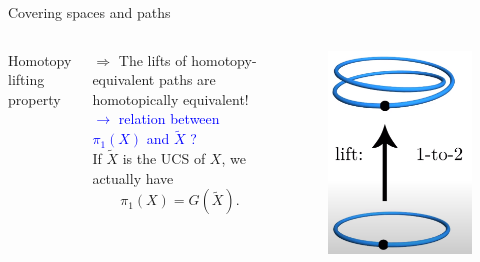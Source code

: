 \documentclass[9pt]{beamer}
\begin{document}
\begin{frame}{Covering spaces and paths}
\begin{columns}[T,onlytextwidth]
\begin{block}{Homotopy lifting property}
            \end{block}
            $\Rightarrow$ The lifts of homotopy-equivalent paths are homotopically equivalent! \textcolor{blue}{$\to$ relation between $\pi_1(X)$ and $\tilde{X}$ ?}\\
            If $\tilde{X}$ is the UCS of $X$, we actually have
            \begin{equation*}
                \boxed{\pi_1(X)=G(\tilde{X}).}
            \end{equation*}
            
            
  
        \begin{figure}
            \centering
            \includegraphics[scale=0.1]{Pictures/lifting_point.png}

\end{figure}
\end{columns}
\end{frame}
\end{document}
